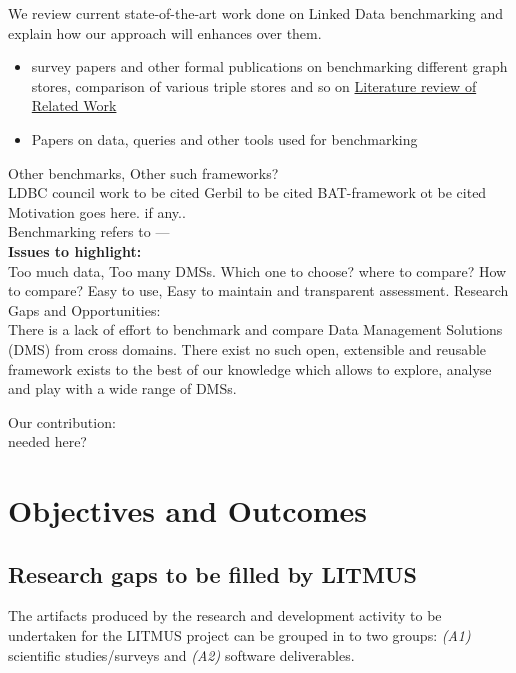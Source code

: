 \documentclass{llncs}
\begin{document}
    
    We review current state-of-the-art work done on Linked Data benchmarking and explain how our approach will enhances over them.


    \begin{itemize}
        \item survey papers and other formal publications on benchmarking different graph stores, comparison of various triple stores and so on
        \href{https://docs.google.com/document/d/1DbtHvE4oaSuusPjeM2nGNBzrRArQt_rlCh3J5g2aIAE/edit?usp=sharing}{Literature review of Related Work}
        
        \item Papers on data, queries and other tools used for benchmarking
    \end{itemize}
    
    
    Other benchmarks, Other such frameworks? \\
    LDBC council work to be cited
    Gerbil to be cited
    BAT-framework ot be cited \\
    
   {\color{red} Motivation goes here. if any..} \\
    Benchmarking refers to --- \\
    \textbf{Issues to highlight:} \\Too much data, Too many DMSs. Which one to choose? where to compare? How to compare? Easy to use, Easy to maintain and transparent assessment.
    Research Gaps and Opportunities: \\
    There is a lack of effort to benchmark and compare Data Management Solutions (DMS) from cross domains. There exist no such open, extensible and reusable framework exists to the best of our knowledge which allows to explore, analyse and play with a wide range of DMSs.
    
    Our contribution:\\
    needed here?  

\section{Objectives and Outcomes}
    \subsection{Research gaps to be filled by LITMUS}
    The artifacts produced by the research and development activity to be undertaken for the LITMUS project can be grouped in to two groups: \textit{(A1)} scientific studies/surveys and \textit{(A2)} software deliverables. 
    
\end{document}
